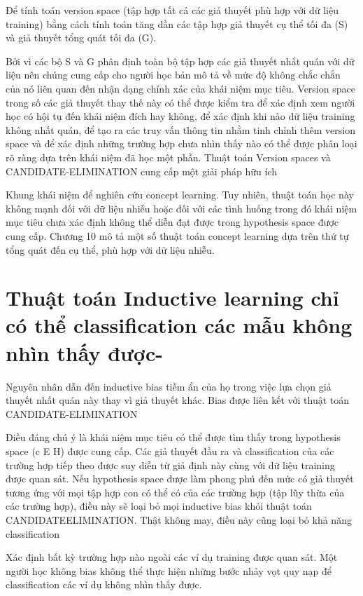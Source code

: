 Để tính toán version space (tập hợp tất cả các giả thuyết phù hợp với dữ liệu training) bằng cách tính toán tăng dần các tập hợp giả thuyết cụ thể tối đa (S) và giả thuyết tổng quát tối đa (G).

Bởi vì các bộ S và G phân định toàn bộ tập hợp các giả thuyết nhất quán với dữ liệu nên chúng cung cấp cho người học bản mô tả về mức độ không chắc chắn của nó liên quan đến nhận dạng chính xác của khái niệm mục tiêu. Version space trong số các giả thuyết thay thế này có thể được kiểm tra để xác định xem người học có hội tụ đến khái niệm đích hay không, để xác định khi nào dữ liệu training không nhất quán, để tạo ra các truy vấn thông tin nhằm tinh chỉnh thêm version space và để xác định những trường hợp chưa nhìn thấy nào có thể được phân loại rõ ràng dựa trên khái niệm đã học một phần. Thuật toán Version spaces và CANDIDATE-ELIMINATION cung cấp một giải pháp hữu ích

Khung khái niệm để nghiên cứu concept learning. Tuy nhiên, thuật toán học này không mạnh đối với dữ liệu nhiễu hoặc đối với các tình huống trong đó khái niệm mục tiêu chưa xác định không thể diễn đạt được trong hypothesis space được cung cấp. Chương 10 mô tả một số thuật toán concept learning dựa trên thứ tự tổng quát đến cụ thể, phù hợp với dữ liệu nhiễu.

\section{Thuật toán Inductive learning chỉ có thể classification các mẫu không nhìn thấy được-}

Nguyên nhân dẫn đến inductive bias tiềm ẩn của họ trong việc lựa chọn giả thuyết nhất quán này thay vì giả thuyết khác. Bias được liên kết với thuật toán CANDIDATE-ELIMINATION

Điều đáng chú ý là khái niệm mục tiêu có thể được tìm thấy trong hypothesis space (c E H) được cung cấp. Các giả thuyết đầu ra và classification của các trường hợp tiếp theo được suy diễn từ giả định này cùng với dữ liệu training được quan sát. Nếu hypothesis space được làm phong phú đến mức có giả thuyết tương ứng với mọi tập hợp con có thể có của các trường hợp (tập lũy thừa của các trường hợp), điều này sẽ loại bỏ mọi inductive bias khỏi thuật toán CANDIDATEELIMINATION. Thật không may, điều này cũng loại bỏ khả năng classification

Xác định bất kỳ trường hợp nào ngoài các ví dụ training được quan sát. Một người học không bias không thể thực hiện những bước nhảy vọt quy nạp để classification các ví dụ không nhìn thấy được.

